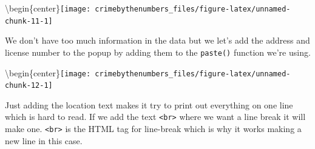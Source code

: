 \documentclass[
]{krantz}
\makeatletter
\newenvironment{Shaded}{\begin{snugshade}}{\end{snugshade}}
\newcommand{\AttributeTok}[1]{\textcolor[rgb]{0.61,0.61,0.61}{#1}}
\newcommand{\DecValTok}[1]{\textcolor[rgb]{0.06,0.06,0.06}{#1}}
\newcommand{\FunctionTok}[1]{\textcolor[rgb]{0,0,0}{#1}}
\newcommand{\NormalTok}[1]{#1}
\newcommand{\SpecialCharTok}[1]{\textcolor[rgb]{0,0,0}{#1}}
\newcommand{\StringTok}[1]{\textcolor[rgb]{0.5,0.5,0.5}{#1}}
\newenvironment{kframe}{%
\medskip{}
\setlength{\fboxsep}{.8em}
 \def\at@end@of@kframe{}%
 \ifinner\ifhmode%
  \def\at@end@of@kframe{\end{minipage}}%
  \begin{minipage}{\columnwidth}%
 \fi\fi%
 \def\FrameCommand##1{\hskip\@totalleftmargin \hskip-\fboxsep
 \colorbox{shadecolor}{##1}\hskip-\fboxsep
     \hskip-\linewidth \hskip-\@totalleftmargin \hskip\columnwidth}%
 \MakeFramed {\advance\hsize-\width
   \@totalleftmargin\z@ \linewidth\hsize
   \@setminipage}}%
 {\par\unskip\endMakeFramed%
 \at@end@of@kframe}
\renewenvironment{Shaded}{\begin{kframe}}{\end{kframe}}
\makeatother
\begin{document}
\textbackslash begin\{center\}\texttt{[image: crimebythenumbers\_files/figure-latex/unnamed-chunk-11-1]}

We don't have too much information in the data but we let's add the address and license number to the popup by adding them to the \texttt{paste()} function we're using.

\begin{Shaded}
\end{Shaded}

\textbackslash begin\{center\}\texttt{[image: crimebythenumbers\_files/figure-latex/unnamed-chunk-12-1]}

Just adding the location text makes it try to print out everything on one line which is hard to read. If we add the text \texttt{\textless{}br\textgreater{}} where we want a line break it will make one. \texttt{\textless{}br\textgreater{}} is the HTML tag for line-break which is why it works making a new line in this case.
\end{document}
